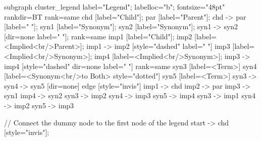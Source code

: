 \documentclass{article}
\begin{document}
{subgraph cluster_legend {
    label="Legend";
    labelloc="b";
    fontsize="48pt"
    rankdir=BT
    {
        rank=same
        chd [label="Child"];
        par [label="Parent"];
        chd -> par [label="                "];
        syn1 [label="Synonym"];
        syn2 [label="Synonym"];
        syn1 -> syn2 [dir=none label="                "];
    }
    {
        rank=same
        imp1 [label="Child"];
        imp2 [label=<Implied<br/>Parent>];
        imp1 -> imp2 [style="dashed" label="                "]
        imp3 [label=<Implied<br/>Synonym>];
        imp4 [label=<Implied<br/>Synonym>];
        imp3 -> imp4 [style="dashed" dir=none label="                "]
    }
    {
        rank=same
        syn3 [label=<Term>]
        syn4 [label=<Synonym<br/>to Both> style="dotted"]
        syn5 [label=<Term>]
        syn3 -> syn4 -> syn5 [dir=none]
    }
    edge [style="invis"]
    imp1 -> chd
    imp2 -> par
    imp3 -> syn1
    imp4 -> syn2
syn3 -> imp2
syn4 -> imp3
syn5 -> imp4
syn3 -> imp1
syn4 -> imp2
syn5 -> imp3
}

// Connect the dummy node to the first node of the legend
start -> chd [style="invis"];
}
\end{document}
